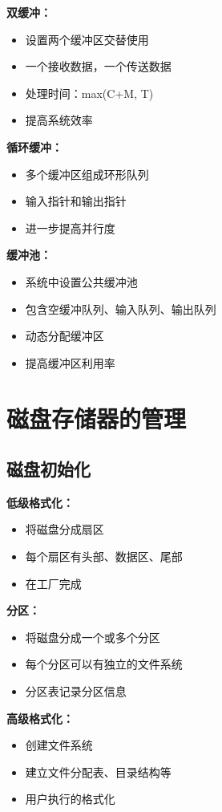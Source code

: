 \documentclass[lang=cn,newtx,10pt,scheme=chinese]{../../elegantbook}
\begin{document}
\textbf{双缓冲：}
\begin{itemize}
  \item 设置两个缓冲区交替使用
  \item 一个接收数据，一个传送数据
  \item 处理时间：max(C+M, T)
  \item 提高系统效率
\end{itemize}

\textbf{循环缓冲：}
\begin{itemize}
  \item 多个缓冲区组成环形队列
  \item 输入指针和输出指针
  \item 进一步提高并行度
\end{itemize}

\textbf{缓冲池：}
\begin{itemize}
  \item 系统中设置公共缓冲池
  \item 包含空缓冲队列、输入队列、输出队列
  \item 动态分配缓冲区
  \item 提高缓冲区利用率
\end{itemize}

\section{磁盘存储器的管理}

\subsection{磁盘初始化}

\textbf{低级格式化：}
\begin{itemize}
  \item 将磁盘分成扇区
  \item 每个扇区有头部、数据区、尾部
  \item 在工厂完成
\end{itemize}

\textbf{分区：}
\begin{itemize}
  \item 将磁盘分成一个或多个分区
  \item 每个分区可以有独立的文件系统
  \item 分区表记录分区信息
\end{itemize}

\textbf{高级格式化：}
\begin{itemize}
  \item 创建文件系统
  \item 建立文件分配表、目录结构等
  \item 用户执行的格式化
\end{itemize}
\end{document}

